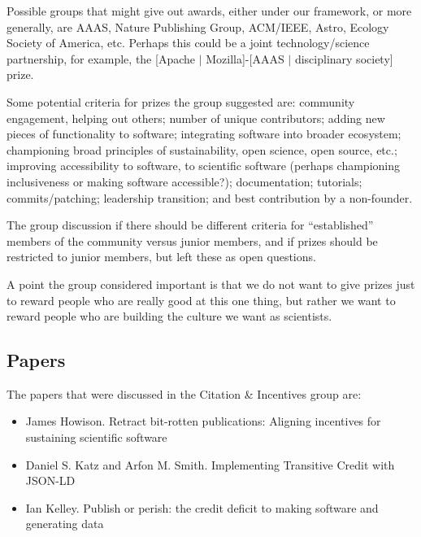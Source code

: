 \documentclass[11pt, oneside]{amsart}
\begin{document}
Possible groups that might give out awards, either under our framework, or more
generally, are AAAS, Nature Publishing Group, ACM/IEEE, Astro, Ecology Society
of America, etc. Perhaps this could be a joint technology/science partnership,
for example, the [Apache $|$ Mozilla]-[AAAS $|$ disciplinary society] prize.

Some potential criteria for prizes the group suggested are:
community engagement, helping out others;
number of unique contributors;
adding new pieces of functionality to software;
integrating software into broader ecosystem; championing broad principles of
sustainability, open science, open source, etc.;
improving accessibility to software, to scientific software (perhaps championing
inclusiveness or making software accessible?);
documentation;
tutorials;
commits/patching;
leadership transition; and
best contribution by a non-founder.

The group discussion if there should be different criteria for ``established''
members of the community versus junior members, and if prizes should be
restricted to junior members, but left these as open questions.

A point the group considered important is that we do not want to give prizes just
to reward people who are really good at this one thing, but rather we want to
reward people who are building the culture we want as scientists.





\subsection{Papers}
The papers that were discussed in the Citation \& Incentives group are:
\begin{itemize}
\item James Howison. Retract bit-rotten publications: Aligning incentives for
sustaining scientific software~\cite{wssspe2_howison}

\item Daniel S. Katz and Arfon M. Smith. Implementing Transitive Credit with
{JSON-LD}~\cite{wssspe2_katz}

\item Ian Kelley. Publish or perish: the credit deficit to making software and
generating data~\cite{wssspe2_kelley}
\end{itemize}
\end{document}
